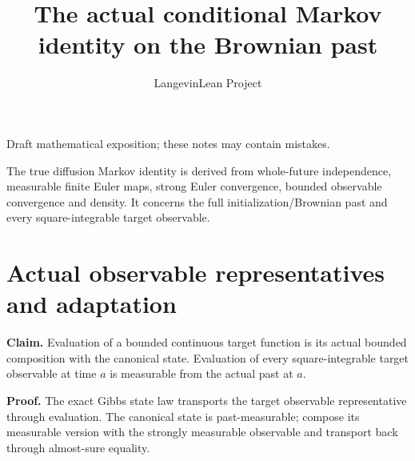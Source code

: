 \documentclass[11pt,a4paper]{article}
\title{\texorpdfstring{The actual conditional Markov identity on the Brownian past}{The actual conditional Markov identity on the Brownian past}}
\author{LangevinLean Project}
\date{}
\begin{document}
\maketitle
Draft mathematical exposition; these notes may contain mistakes.


The true diffusion Markov identity is derived from whole-future independence, measurable finite Euler maps, strong Euler convergence, bounded observable convergence and density. It concerns the full initialization/\allowbreak{}Brownian past and every square-integrable target observable.


\section{\texorpdfstring{Actual observable representatives and adaptation}{Actual observable representatives and adaptation}}


\textbf{Claim.} Evaluation of a bounded continuous target function is its actual bounded composition with the canonical state. Evaluation of every square-integrable target observable at time \(a\) is measurable from the actual past at \(a\).



\textbf{Proof.} The exact Gibbs state law transports the target observable representative through evaluation. The canonical state is past-measurable; compose its measurable version with the strongly measurable observable and transport back through almost-sure equality.
\end{document}
